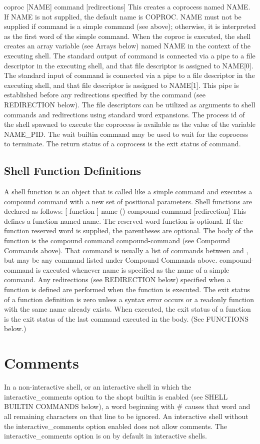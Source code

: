 \documentclass[11pt]{article}
\begin{document}
coproc [NAME] command [redirections]
This creates a coprocess named NAME. If NAME is not supplied, the default name is COPROC. NAME must not be supplied if command is a simple command (see above); otherwise, it is interpreted as the first word of the simple command. When the coproc is executed, the shell creates an array variable (see Arrays below) named NAME in the context of the executing shell. The standard output of command is connected via a pipe to a file descriptor in the executing shell, and that file descriptor is assigned to NAME[0]. The standard input of command is connected via a pipe to a file descriptor in the executing shell, and that file descriptor is assigned to NAME[1]. This pipe is established before any redirections specified by the command (see REDIRECTION below). The file descriptors can be utilized as arguments to shell commands and redirections using standard word expansions. The process id of the shell spawned to execute the coprocess is available as the value of the variable NAME_PID. The wait builtin command may be used to wait for the coprocess to terminate.
The return status of a coprocess is the exit status of command.

\subsection{Shell Function Definitions}

A shell function is an object that is called like a simple command and executes a compound command with a new set of positional parameters. Shell functions are declared as follows:
[ function ] name () compound-command [redirection]
This defines a function named name. The reserved word function is optional. If the function reserved word is supplied, the parentheses are optional. The body of the function is the compound command compound-command (see Compound Commands above). That command is usually a list of commands between { and }, but may be any command listed under Compound Commands above. compound-command is executed whenever name is specified as the name of a simple command. Any redirections (see REDIRECTION below) specified when a function is defined are performed when the function is executed. The exit status of a function definition is zero unless a syntax error occurs or a readonly function with the same name already exists. When executed, the exit status of a function is the exit status of the last command executed in the body. (See FUNCTIONS below.)

\section{Comments}
In a non-interactive shell, or an interactive shell in which the interactive_comments option to the shopt builtin is enabled (see SHELL BUILTIN COMMANDS below), a word beginning with # causes that word and all remaining characters on that line to be ignored. An interactive shell without the interactive_comments option enabled does not allow comments. The interactive_comments option is on by default in interactive shells.
\end{document}
